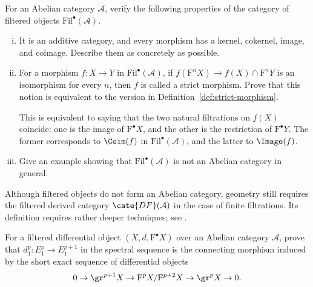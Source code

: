 
\begin{Exercises}
	\item For an Abelian category $\mathcal{A}$, verify the following
	properties of the category of filtered objects
	$\mathrm{Fil}^\bullet(\mathcal{A})$.
	\begin{enumerate}[(i)]
		\item It is an additive category, and every morphism has a kernel,
		cokernel, image, and coimage. Describe them as concretely as possible.
		\item For a morphism $f:X\to Y$ in
		$\mathrm{Fil}^\bullet(\mathcal{A})$, if
		$f(\mathrm{F}^nX)\to f(X)\cap\mathrm{F}^nY$ is an isomorphism for
		every $n$, then $f$ is called a strict morphism. Prove that this notion
		is equivalent to the version in Definition~\ref{def:strict-morphism}.

		\begin{hint}
			This is equivalent to saying that the two natural filtrations on
			$f(X)$ coincide: one is the image of $\mathrm{F}^\bullet X$, and
			the other is the restriction of $\mathrm{F}^\bullet Y$. The former
			corresponds to $\Coim(f)$ in
			$\mathrm{Fil}^\bullet(\mathcal{A})$, and the latter to $\Image(f)$.
		\end{hint}
		\item Give an example showing that
		$\mathrm{Fil}^\bullet(\mathcal{A})$ is not an Abelian category in
		general.
	\end{enumerate}
	Although filtered objects do not form an Abelian category, geometry still
	requires the filtered derived category $\cate{DF}(\mathcal{A})$ in the
	case of finite filtrations. Its definition requires rather deeper
	techniques; see \cite[Tag 05RX]{stacks}.

	\item For a filtered differential object
	$(X,d,\mathrm{F}^\bullet X)$ over an Abelian category $\mathcal{A}$,
	prove that $d_1^p:E_1^p\to E_1^{p+1}$ in the spectral sequence is the
	connecting morphism induced by the short exact sequence of differential
	objects
	\[ 0\to\gr^{p+1}X\to\mathrm{F}^pX/\mathrm{F}^{p+2}X
	\to\gr^pX\to0. \]


\end{Exercises}
